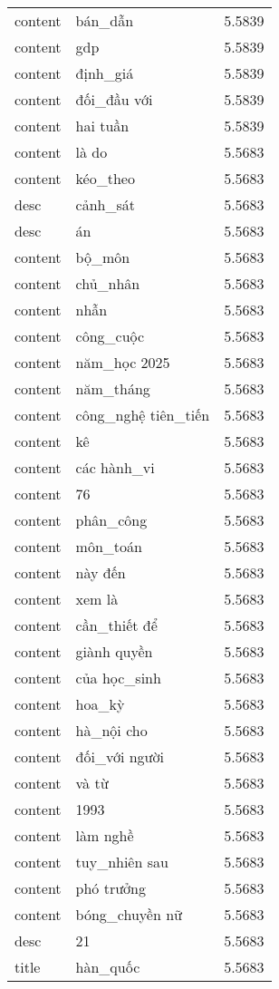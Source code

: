 \documentclass{article}
\begin{document}
\begin{tabular}{lll}
content & bán\_dẫn & 5.5839\\
content & gdp & 5.5839\\
content & định\_giá & 5.5839\\
content & đối\_đầu với & 5.5839\\
content & hai tuần & 5.5839\\
content & là do & 5.5683\\
content & kéo\_theo & 5.5683\\
desc & cảnh\_sát & 5.5683\\
desc & án & 5.5683\\
content & bộ\_môn & 5.5683\\
content & chủ\_nhân & 5.5683\\
content & nhẫn & 5.5683\\
content & công\_cuộc & 5.5683\\
content & năm\_học 2025 & 5.5683\\
content & năm\_tháng & 5.5683\\
content & công\_nghệ tiên\_tiến & 5.5683\\
content & kê & 5.5683\\
content & các hành\_vi & 5.5683\\
content & 76 & 5.5683\\
content & phân\_công & 5.5683\\
content & môn\_toán & 5.5683\\
content & này đến & 5.5683\\
content & xem là & 5.5683\\
content & cần\_thiết để & 5.5683\\
content & giành quyền & 5.5683\\
content & của học\_sinh & 5.5683\\
content & hoa\_kỳ & 5.5683\\
content & hà\_nội cho & 5.5683\\
content & đối\_với người & 5.5683\\
content & và từ & 5.5683\\
content & 1993 & 5.5683\\
content & làm nghề & 5.5683\\
content & tuy\_nhiên sau & 5.5683\\
content & phó trưởng & 5.5683\\
content & bóng\_chuyền nữ & 5.5683\\
desc & 21 & 5.5683\\
title & hàn\_quốc & 5.5683\\

\end{tabular}
\end{document}
